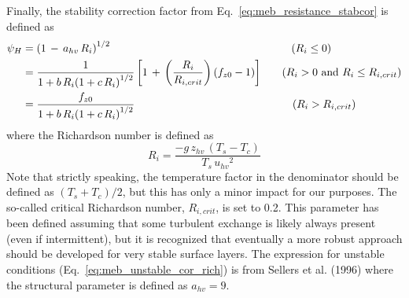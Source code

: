 Finally, the stability correction 
factor from Eq.~\ref{eq:meb_resistance_stabcor} is defined
as
%
\begin{subequations}
\begin{align}
  \label{eq:meb_unstable_cor_rich}
\psi_H & = {\left( 1 \,-\, a_{hv}\,R_i\right)}^{1/2}
\hskip2.3in \left( R_i \leq 0 \right)
\\
%
%
%
\label{eq:meb_stable_cor_rich_new_trans}
& = 
%
%
{\frac{1}{1 + b\, R_i {\left(1+c\,R_i\right)}^{1/2}}}
\left[{ 1 \,+\, \left({\frac{R_i}{R_{i,crit}}} \right) \left(f_{z0} - 1 \right)}\right]
\hskip.25in \left( R_i > 0 \,\,{\mathrm{and}}\,\, R_i \leq R_{i,crit} \right)
\\
\label{eq:meb_stable_cor_rich_new}
& = 
%
{\frac{f_{z0}}{1 + b\, R_i {\left(1+c\,R_i\right)}^{1/2}}} 
\hskip2.in \left( R_i > R_{i,crit}\right)
%
\end{align}
\end{subequations}
%
where the Richardson number is defined as
%
\begin{equation}
  \label{eq:meb_canopy_ground_rich}
R_i = {\frac { -g\,z_{hv}\,\left(T_s - T_c \right)}{T_s \, {u_{hv}}^2}}
%
\end{equation}
%
Note that strictly speaking, the temperature factor in the denominator should be defined as
$\left(T_s+T_c\right)/2$, but this has only a minor impact for our
purposes.
%
The so-called critical Richardson number, $R_{i,crit}$, is set to 0.2.
This parameter has been defined assuming that
some turbulent exchange is likely always present (even if intermittent), 
but it is recognized 
that eventually a more robust approach should be developed for very
stable surface layers. 
%
The expression for unstable conditions
(Eq.~\ref{eq:meb_unstable_cor_rich}) 
is from 
Sellers et al. (1996)\nocite{Sellers96} 
where
the structural parameter is defined as $a_{hv}=9$. 
%
